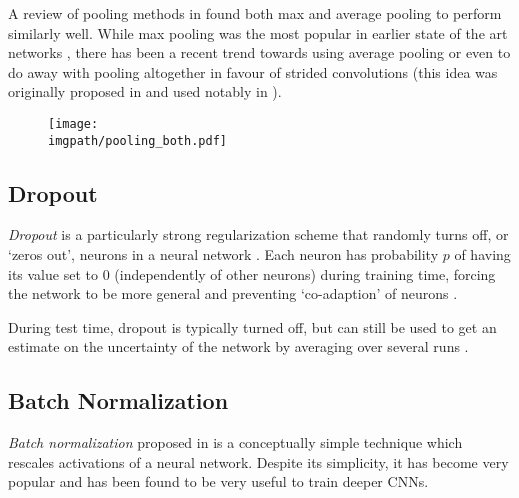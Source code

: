 A review of pooling methods in \cite{mishkin_systematic_2017} found both
max and average pooling to perform similarly well. While max pooling was the most
popular in earlier state of the art networks \cite{krizhevsky_imagenet_2012,
simonyan_very_2014}, there has been a recent trend towards using average pooling
\cite{huang_densely_2017} or even to do away with pooling altogether in favour
of strided convolutions (this idea was originally proposed in
\cite{springenberg_striving_2015} and used notably in \cite{he_deep_2016,
xie_aggregated_2017, zagoruyko_wide_2016}).

\begin{figure}
  \centering
  \texttt{[image: \\imgpath/pooling\_both.pdf]}
  \label{fig:ch2:maxpool}
\end{figure}

\subsection{Dropout}
\emph{Dropout} is a particularly strong regularization scheme that randomly turns off,
or `zeros out', neurons in a neural network \cite{hinton_improving_2012, srivastava_dropout:_2014}.
Each neuron has probability $p$ of having its value set to 0 (independently of
other neurons) during training
time, forcing the network to be more general and preventing `co-adaption' of
neurons \cite{srivastava_dropout:_2014}.

During test time, dropout is typically turned off, but can still be
used to get an estimate on the uncertainty of the network by averaging over
several runs \cite{gal_dropout_2016}.

\subsection{Batch Normalization}
\emph{Batch normalization} proposed in \cite{ioffe_batch_2015} is a conceptually
simple technique which rescales activations of a neural network. Despite its
simplicity, it has become very popular and has been found to be very useful to
train deeper CNNs.


